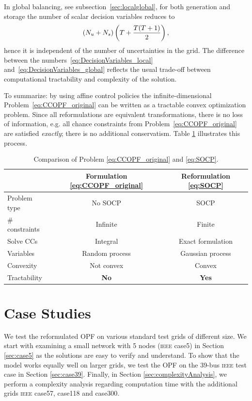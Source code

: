 \documentclass[final,3p,times,twocolumn]{elsarticle}  %
\begin{document}
In global balancing, see subsection~\ref{sec:localglobal}, for both generation and storage the number of scalar decision variables reduces to
\begin{equation}
\label{eq:DecisionVariables_global}
(N_u + N_s) \left( T + \frac{T (T + 1)}{2} \right),
\end{equation}
hence it is independent of the number of uncertainties in the grid.
The difference between the numbers~\eqref{eq:DecisionVariables_local} and~\eqref{eq:DecisionVariables_global} reflects the usual trade-off between computational tractability and complexity of the solution.

To summarize: by using affine control policies the infinite-dimensional Problem~\eqref{eq:CCOPF_original} can be written as a tractable convex optimization problem. Since all reformulations are equivalent transformations, there is no loss of information, e.g. all chance constraints from Problem~\eqref{eq:CCOPF_original} are satisfied \emph{exactly}; there is no additional conservatism. Table \ref{tab:comparison_CCOPF_SOCP} illustrates this process.

\begin{table}[ht]
\centering
\caption{Comparison of Problem \eqref{eq:CCOPF_original} and \eqref{eq:SOCP}.}
\label{tab:comparison_CCOPF_SOCP}
\begin{tabular}[t]{lcc}
\toprule
\footnotesize
& Formulation \eqref{eq:CCOPF_original} & Reformulation \eqref{eq:SOCP} \\
\midrule
Problem type    & No SOCP       & SOCP \\
\# constraints  & Infinite      & Finite \\
Solve CCs       & Integral      & Exact formulation \\
Variables       & Random process & Gaussian process \\
Convexity       & Not convex    & Convex \\
Tractability     & \textbf{No}    & \textbf{Yes} \\
\bottomrule
\end{tabular}
\end{table}%
\normalsize

\section{Case Studies}
\label{sec:CaseStudy}

We test the reformulated OPF on various standard test grids of different size. We start with examining a small network with 5 nodes (\textsc{ieee} case5) in Section \ref{sec:case5} as the solutions are easy to verify and understand. To show that the model works equally well on larger grids, we test the OPF on the 39-bus \textsc{ieee} test case in Section \ref{sec:case39}.
Finally, in Section \ref{sec:complexityAnalysis}, we perform a complexity analysis regarding computation time with the additional grids \textsc{ieee} case57, case118 and case300. 
\end{document}
